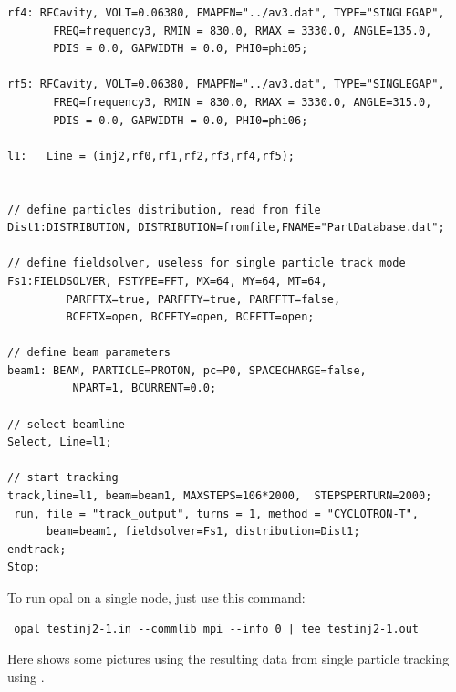 {\begin{verbatim}
rf4: RFCavity, VOLT=0.06380, FMAPFN="../av3.dat", TYPE="SINGLEGAP", 
       FREQ=frequency3, RMIN = 830.0, RMAX = 3330.0, ANGLE=135.0,
       PDIS = 0.0, GAPWIDTH = 0.0, PHI0=phi05; 

rf5: RFCavity, VOLT=0.06380, FMAPFN="../av3.dat", TYPE="SINGLEGAP", 
       FREQ=frequency3, RMIN = 830.0, RMAX = 3330.0, ANGLE=315.0, 
       PDIS = 0.0, GAPWIDTH = 0.0, PHI0=phi06; 

l1:   Line = (inj2,rf0,rf1,rf2,rf3,rf4,rf5);


// define particles distribution, read from file
Dist1:DISTRIBUTION, DISTRIBUTION=fromfile,FNAME="PartDatabase.dat"; 

// define fieldsolver, useless for single particle track mode 
Fs1:FIELDSOLVER, FSTYPE=FFT, MX=64, MY=64, MT=64, 
		 PARFFTX=true, PARFFTY=true, PARFFTT=false,
		 BCFFTX=open, BCFFTY=open, BCFFTT=open;
		 
// define beam parameters
beam1: BEAM, PARTICLE=PROTON, pc=P0, SPACECHARGE=false, 
	      NPART=1, BCURRENT=0.0;

// select beamline
Select, Line=l1;

// start tracking
track,line=l1, beam=beam1, MAXSTEPS=106*2000,  STEPSPERTURN=2000;
 run, file = "track_output", turns = 1, method = "CYCLOTRON-T",
      beam=beam1, fieldsolver=Fs1, distribution=Dist1;
endtrack;
Stop;

\end{verbatim}
}
To run opal on a single node, just use this command:
{ \footnotesize 
\begin{verbatim}
 opal testinj2-1.in --commlib mpi --info 0 | tee testinj2-1.out
\end{verbatim}
}
Here shows some pictures using the resulting data from single particle tracking using \opalcycl.

